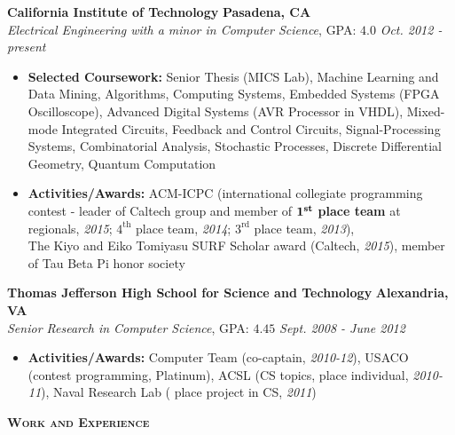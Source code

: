 \documentclass{article}
\newenvironment{changemargin}[2]{%
  \begin{list}{}{%
    \setlength{\topsep}{0pt}%
    \setlength{\leftmargin}{#1}%
    \setlength{\rightmargin}{#2}%
    \setlength{\listparindent}{\parindent}%
    \setlength{\itemindent}{\parindent}%
    \setlength{\parsep}{\parskip}%
  }%
  \item[]}{\end{list}
}
\newcommand{\lineover}{
	\begin{changemargin}{-0.05in}{-0.05in}
		\vspace*{-8pt}
		\hrulefill \\
		\vspace*{-2pt}
	\end{changemargin}
}
\newcommand{\header}[1]{
	\begin{changemargin}{-.5in}{-0.5in}
		{\large \textbf{\scshape{#1}}}\\
  	\lineover
	\end{changemargin}
}
\newenvironment{body} {
	\vspace*{-16pt}
	\begin{changemargin}{-0.25in}{-0.5in}
  }	
	{\end{changemargin}
}
\begin{document}
\begin{body}
	\vspace{14pt}
	\textbf{California Institute of Technology} \hfill \textbf{Pasadena, CA} \\
	\emph{Electrical Engineering with a minor in Computer Science}, GPA: $4.0$ \hfill \emph{Oct. 2012 - present} \\
	\begin{itemize}
	\item \textbf{Selected Coursework:} Senior Thesis (MICS Lab), Machine Learning and Data Mining, Algorithms, Computing Systems, Embedded Systems (FPGA Oscilloscope), Advanced Digital Systems (AVR Processor in VHDL), Mixed-mode Integrated Circuits, Feedback and Control Circuits, Signal-Processing Systems, Combinatorial Analysis, Stochastic Processes, Discrete Differential Geometry, Quantum Computation
	\item \textbf{Activities/Awards:} ACM-ICPC (international collegiate programming contest - leader of Caltech group and member of $\boldsymbol{1}^\text{\textbf{st}}$ \textbf{place team} at regionals, \textit{2015}; $4^\text{th}$ place team, \textit{2014}; $3^\text{rd}$ place team, \textit{2013}),\\The Kiyo and Eiko Tomiyasu SURF Scholar award (Caltech, \textit{2015}), member of Tau Beta Pi honor society
	\end{itemize}

	\smallskip

	\textbf{Thomas Jefferson High School for Science and Technology} \hfill \textbf{Alexandria, VA} \\
	\emph{Senior Research in Computer Science}, GPA: $4.45$ \hfill \emph{Sept. 2008 - June 2012} \\
	\begin{itemize}
	\item \textbf{Activities/Awards:} Computer Team (co-captain, \textit{2010-12}), USACO (contest programming, Platinum), ACSL (CS topics,  place individual, \textit{2010-11}), Naval Research Lab ( place project in CS, \textit{2011})
	\end{itemize}
\end{body}

\smallskip


\header{Work and Experience}
\end{document}
